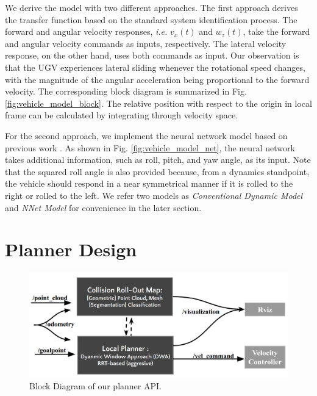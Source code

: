 \documentclass[../thesis.tex]{subfiles}
\begin{document}

We derive the model with two different approaches. 
The first approach derives the transfer function based on the standard system identification process. 
The forward and angular velocity responses, \textit{i.e.} $v_x(t)$ and $w_z(t)$, take the forward and angular velocity commands as inputs, respectively. 
The lateral velocity response, on the other hand, uses both commands as input. Our observation is that the UGV experiences lateral sliding whenever the rotational speed changes, with the magnitude of the angular acceleration being proportional to the forward velocity. 
The corresponding block diagram is summarized in Fig. \ref{fig:vehicle_model_block}. 
The relative position with respect to the origin in local frame can be calculated by integrating through velocity space.
 
For the second approach, we implement the neural network model based on previous work \cite{bode2007learning}. As shown in Fig. \ref{fig:vehicle_model_net}, the neural network takes additional information, such as roll, pitch, and yaw angle, as its input. Note that the squared roll angle is also provided because, from a dynamics standpoint, the vehicle should respond in a near symmetrical manner if it is rolled to the right or rolled to the left.
We refer two models as \textit{Conventional Dynamic Model} and \textit{NNet Model} for convenience in the later section.
 
 
\section{Planner Design} \label{sec:rrt-planner}
 
 
\begin{figure}[t]
    	\begin{center}
    	 \centerline{\includegraphics[width=0.8\columnwidth]{./RRTPlanner/fig/planner_module.png}}
           	\caption{Block Diagram of our planner API.}
           	\label{fig:planner_module}
    	\end{center}
\end{figure}
 
\end{document}
